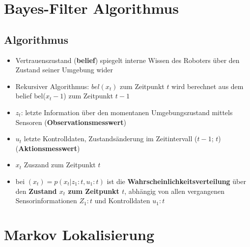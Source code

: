 \section{Bayes-Filter Algorithmus}
\subsection{Algorithmus}
\begin{itemize}
	\item Vertrauenszustand (\textbf{belief}) spiegelt interne Wissen des Roboters über den Zustand seiner Umgebung wider
	\item Rekursiver Algorithmus: $bel(x_t)$ zum Zeitpunkt $t$ wird berechnet aus dem belief bel($x_t-1$) zum Zeitpunkt $t-1$
	\item $z_t$: letzte Information über den momentanen Umgebungszustand mittels Sensoren (\textbf{Observationsmesswert})
	\item $u_t$ letzte Kontrolldaten, Zustandsänderung im Zeitintervall ($t-1$; $t$) (\textbf{Aktionsmesswert})
	\item $x_t$ Zuszand zum Zeitpunkt $t$
	\item bei $(x_t) = p(x_t |z_1:t, u_1:t)$ ist die \textbf{Wahrscheinlichkeitsverteilung} über den \textbf{Zustand $x_t$ zum Zeitpunkt $t$}, abhängig von allen vergangenen Sensorinformationen $Z_1:t$ und Kontrolldaten $u_1:t$ 
\end{itemize}
\newpage
\section{Markov Lokalisierung}
